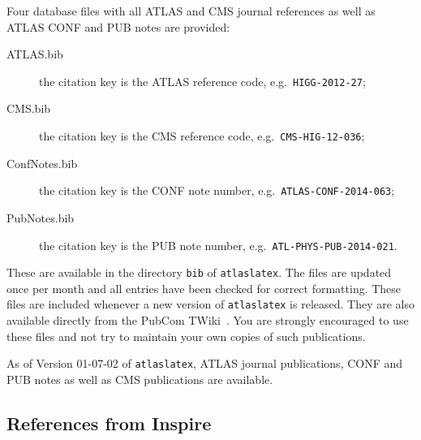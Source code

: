 \documentclass[UKenglish, texlive=2016]{\ATLASLATEXPATH atlasdoc}
\newcommand{\File}[1]{\texttt{#1}\xspace}
\newcommand{\Package}[1]{\texttt{#1}\xspace}
\begin{document}
Four database files with all ATLAS and CMS journal references as well as
ATLAS CONF and PUB notes are provided:
\begin{description}
\item[ATLAS.bib] the citation key is the ATLAS reference code, e.g.\ \texttt{HIGG-2012-27};
\item[CMS.bib] the citation key is the CMS reference code, e.g.\ \texttt{CMS-HIG-12-036};
\item[ConfNotes.bib] the citation key is the CONF note number, e.g.\ \texttt{ATLAS-CONF-2014-063};
\item[PubNotes.bib] the citation key is the PUB note number, e.g.\ \texttt{ATL-PHYS-PUB-2014-021}.
\end{description}
These are available in the directory \File{bib} of \Package{atlaslatex}.
The files are updated once per month and all entries have been checked for correct formatting.
These files are included whenever a new version of \Package{atlaslatex} is released.
They are also available directly from the PubCom TWiki~\cite{pubcom-refs}.
You are strongly encouraged to use these files and not try to maintain your own copies of
such publications.

As of Version 01-07-02 of \Package{atlaslatex}, ATLAS journal publications, CONF and PUB notes as well as
CMS publications are available.


\subsection{References from Inspire}
\label{sc:inquire}
\end{document}
